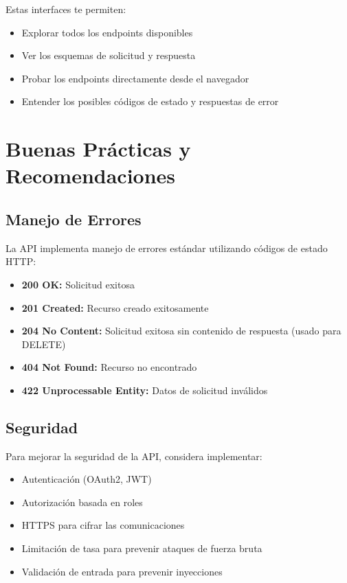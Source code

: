\documentclass[12pt,letterpaper]{report}
\begin{document}
Estas interfaces te permiten:

\begin{itemize}
    \item Explorar todos los endpoints disponibles
    \item Ver los esquemas de solicitud y respuesta
    \item Probar los endpoints directamente desde el navegador
    \item Entender los posibles códigos de estado y respuestas de error
\end{itemize}

\chapter{Buenas Prácticas y Recomendaciones}

\section{Manejo de Errores}
La API implementa manejo de errores estándar utilizando códigos de estado HTTP:

\begin{itemize}
    \item \textbf{200 OK:} Solicitud exitosa
    \item \textbf{201 Created:} Recurso creado exitosamente
    \item \textbf{204 No Content:} Solicitud exitosa sin contenido de respuesta (usado para DELETE)
    \item \textbf{404 Not Found:} Recurso no encontrado
    \item \textbf{422 Unprocessable Entity:} Datos de solicitud inválidos
\end{itemize}

\section{Seguridad}
Para mejorar la seguridad de la API, considera implementar:

\begin{itemize}
    \item Autenticación (OAuth2, JWT)
    \item Autorización basada en roles
    \item HTTPS para cifrar las comunicaciones
    \item Limitación de tasa para prevenir ataques de fuerza bruta
    \item Validación de entrada para prevenir inyecciones
\end{itemize}
\end{document}
